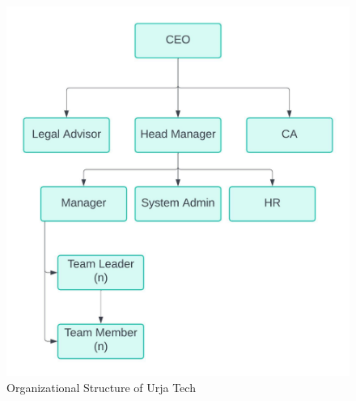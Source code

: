         \begin{figure}[H]
          
          \includegraphics[width=\textwidth]{./Graphics/orgchart.jpeg}
          \caption{Organizational Structure of Urja Tech}
          \label{fig:orgchart}
        \end{figure}
        

